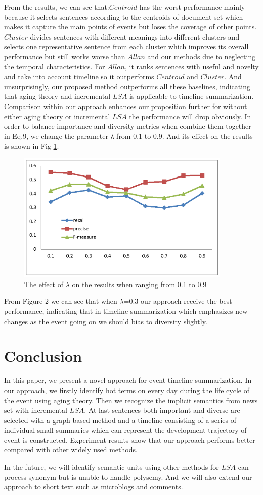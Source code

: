 \documentclass[runningheads,a4paper]{llncs}
\begin{document}
From the results, we can see that:$Centroid$ has the worst performance mainly because it selects sentences according to the centroids of document set which makes it capture the main points of events but loses the coverage of other points. $Cluster$ divides sentences with different meanings into different clusters and selects one representative sentence from each cluster which improves its overall performance but still works worse than $Allan$ and our methods due to neglecting the temporal characteristics. For $Allan$, it ranks sentences with useful and novelty and take into account timeline so it outperforms $Centroid$ and $Cluster$. And unsurprisingly, our proposed method outperforms all these baselines, indicating that aging theory and incremental $LSA$ is applicable to timeline summarization. Comparison within our approach enhances our proposition further for without either aging theory or incremental $LSA$ the performance will drop obviously.
In order to balance importance and diversity metrics when combine them together in Eq.9, we change the parameter λ from 0.1 to 0.9. And its effect on the results is shown in Fig \ref{fig:lambda}.

\begin{figure}
\centering
\includegraphics[height=6.2cm]{lambda}
\caption{The effect of $\lambda$ on the results when ranging from 0.1 to 0.9}
\label{fig:lambda}
\end{figure}

From Figure 2 we can see that when $\lambda$=0.3 our approach receive the best performance, indicating that in timeline summarization which emphasizes new changes as the event going on we should bias to diversity slightly.

\section{Conclusion}
In this paper, we present a novel approach for event timeline summarization. In our approach, we firstly identify hot terms on every day during the life cycle of the event using aging theory. Then we recognize the implicit semantics from news set with incremental $LSA$. At last sentences both important and diverse are selected with a graph-based method and a timeline consisting of a series of individual small summaries which can represent the development trajectory of event is constructed. Experiment results show that our approach performs better compared with other widely used methods.

In the future, we will identify semantic units using other methods for $LSA$ can process synonym but is unable to handle polysemy. And we will also extend our approach to short text such as microblogs and comments.



\end{document}
